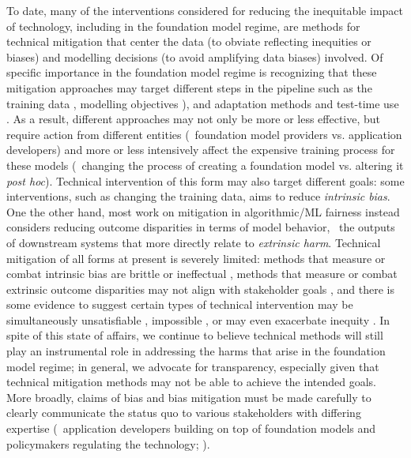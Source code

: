 To date, many of the interventions considered for reducing the inequitable impact of technology, including in the foundation model regime, are methods for technical mitigation that center the data (to obviate reflecting inequities or biases) and modelling decisions (to avoid amplifying data biases) involved.
Of specific importance in the foundation model regime is recognizing that these mitigation approaches may target different steps in the pipeline such as the training data \citep[\eg][]{lu2020}, modelling objectives \citep[\eg][]{zhao2018}), and adaptation methods and test-time use \citep[\eg][]{park2018,zhao2019}.
As a result, different approaches may not only be more or less effective, but require action from different entities (\eg~foundation model providers vs. application developers) and more or less intensively affect the expensive training process for these models (\eg~changing the process of creating a foundation model vs. altering it \textit{post hoc}).
Technical intervention of this form may also target different goals: some interventions, such as changing the training data, aims to reduce \textit{intrinsic bias}.
One the other hand, most work on mitigation in algorithmic/ML fairness instead considers reducing outcome disparities in terms of model behavior, \ie~the outputs of downstream systems that more directly relate to \textit{extrinsic harm}. 
Technical mitigation of all forms at present is severely limited: methods that measure or combat intrinsic bias are brittle or ineffectual \citep{gonen19, ethayarajh2019, bommasani2020, zhou-etal-2021-challenges, Antoniak2021}, methods that measure or combat extrinsic outcome disparities may not align with stakeholder goals \citep{saha2020}, and there is some evidence to suggest certain types of technical intervention may be simultaneously unsatisfiable \citep{CorbettDavies2018, kleinberg2017}, impossible \citep{lechner2021}, or may even exacerbate inequity \citep{xu-etal-2021-detoxifying}.
In spite of this state of affairs, we continue to believe technical methods will still play an instrumental role in addressing the harms that arise in the foundation model regime; in general, we advocate for transparency, especially given that technical mitigation methods may not be able to achieve the intended goals.
More broadly, claims of bias and bias mitigation must be made carefully to clearly communicate the status quo to various stakeholders with differing expertise (\eg~application developers building on top of foundation models and policymakers regulating the technology; \citep{nissim2020}). 

